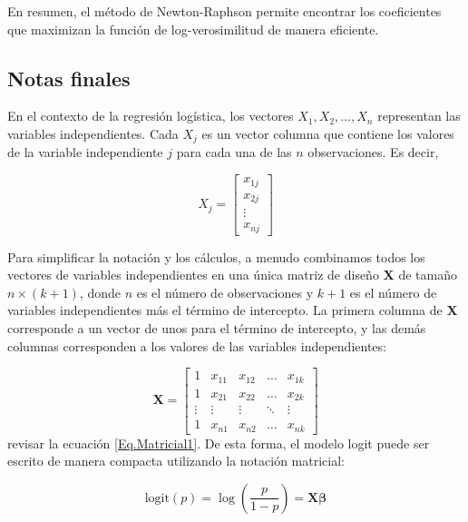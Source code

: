 \documentclass[a4paper]{report} %
\begin{document}
En resumen, el m\'etodo de Newton-Raphson permite encontrar los coeficientes que maximizan la funci\'on de log-verosimilitud de manera eficiente. 

\subsection{Notas finales}

En el contexto de la regresi\'on log\'istica, los vectores $X_1, X_2, \ldots, X_n$ representan las variables independientes. Cada $X_j$ es un vector columna que contiene los valores de la variable independiente $j$ para cada una de las $n$ observaciones. Es decir,

\begin{equation}
X_j = \begin{bmatrix}
x_{1j} \\
x_{2j} \\
\vdots \\
x_{nj}
\end{bmatrix}
\end{equation}

Para simplificar la notaci\'on y los c\'alculos, a menudo combinamos todos los vectores de variables independientes en una \'unica matriz de dise\~no $\mathbf{X}$ de tama\~no $n \times (k+1)$, donde $n$ es el n\'umero de observaciones y $k+1$ es el n\'umero de variables independientes m\'as el t\'ermino de intercepto. La primera columna de $\mathbf{X}$ corresponde a un vector de unos para el t\'ermino de intercepto, y las dem\'as columnas corresponden a los valores de las variables independientes:

\begin{equation}
\mathbf{X} = \begin{bmatrix}
1 & x_{11} & x_{12} & \ldots & x_{1k} \\
1 & x_{21} & x_{22} & \ldots & x_{2k} \\
\vdots & \vdots & \vdots & \ddots & \vdots \\
1 & x_{n1} & x_{n2} & \ldots & x_{nk}
\end{bmatrix}
\end{equation}
revisar la ecuaci\'on \ref{Eq.Matricial1}. De esta forma, el modelo logit puede ser escrito de manera compacta utilizando la notaci\'on matricial:

\begin{equation}
\text{logit}(p) = \log\left(\frac{p}{1-p}\right) = \mathbf{X} \boldsymbol{\beta}
\end{equation}
\end{document}
